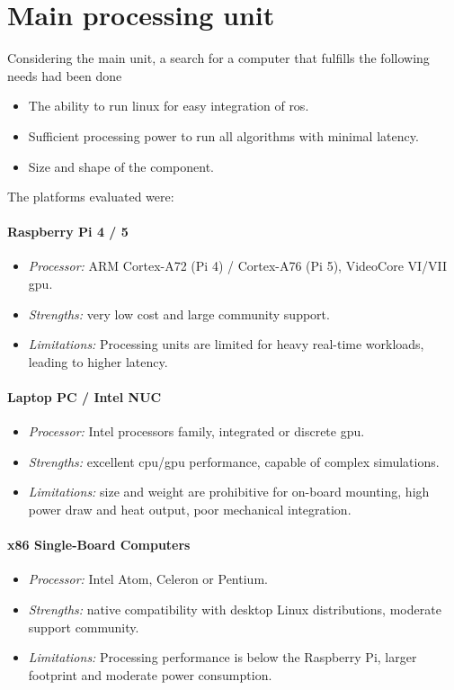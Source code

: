 \section{Main processing unit}

Considering the main unit, a search for a computer that fulfills the following needs had been done
\begin{itemize}
  \item The ability to run \gls{linux} for easy integration of \gls{ros}.
  \item Sufficient processing power to run all algorithms with minimal \gls{latency}.
  \item Size and shape of the component.
\end{itemize}

The platforms evaluated were:

\paragraph*{Raspberry Pi 4 / 5}
\begin{itemize}
  \item \emph{Processor:} ARM Cortex-A72 (Pi 4) / Cortex-A76 (Pi 5), VideoCore VI/VII \gls{gpu}.
  \item \emph{Strengths:} very low cost and large community support.
  \item \emph{Limitations:} Processing units are limited for heavy real-time workloads, leading to higher latency.
\end{itemize}

\paragraph*{Laptop PC / Intel NUC}
\begin{itemize}
  \item \emph{Processor:} Intel processors family, integrated or discrete \gls{gpu}.
  \item \emph{Strengths:} excellent \gls{cpu}/\gls{gpu} performance, capable of complex simulations.
  \item \emph{Limitations:} size and weight are prohibitive for on-board mounting, high power draw and heat output, poor mechanical integration.
\end{itemize}

\paragraph*{x86 Single-Board Computers}
\begin{itemize}
  \item \emph{Processor:} Intel Atom, Celeron or Pentium.
  \item \emph{Strengths:} native compatibility with desktop Linux distributions, moderate support community.
  \item \emph{Limitations:} Processing performance is below the Raspberry Pi, larger footprint and moderate power consumption.
\end{itemize}

